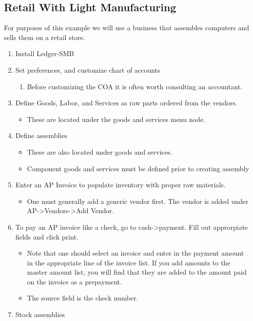 \documentclass{article}
\begin{document}
\subsection{Retail With Light Manufacturing}
For purposes of this example we will use a business that assembles computers and
sells them on a retail store.
\begin{enumerate}
\item Install Ledger-SMB
\item Set preferences, and customize chart of accounts
  \begin{enumerate}
  \item Before customizing the COA it is often worth consulting an accountant.
  \end{enumerate}
\item Define Goods, Labor, and Services as raw parts ordered from the vendors. 
  \begin{itemize}
  \item These are located under the goods and services menu node.
  \end{itemize}
\item Define assemblies
  \begin{itemize}
  \item These are also located under goods and services.
  \item Component goods and services must be defined prior to creating assembly
  \end{itemize}
\item Enter an AP Invoice to populate inventory with proper raw materials.
  \begin{itemize}
  \item One must generally add a generic vendor first.  The vendor is added 
	under AP-\textgreater Vendors-\textgreater Add Vendor.
  \end{itemize}
\item To pay an AP invoice like a check, go to cash->payment.  Fill out
	approrpiate fields and click print.
  \begin{itemize}
    \item Note that one should select an invoice and enter in the payment amount
	in the appropriate line of the invoice list.  If you add amounts to the
	master amount list, you will find that they are added to the amount paid
	on the invoice as a prepayment.
    \item The source field is the check number.
  \end{itemize}
\item Stock assemblies

\end{enumerate}
\end{document}
